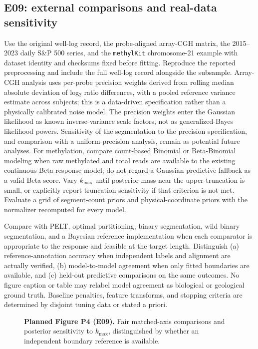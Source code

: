 \subsection{E09: external comparisons and real-data sensitivity}
Use the original well-log record, the probe-aligned array-CGH matrix, the
2015--2023 daily S\&P 500 series, and the \texttt{methylKit} chromosome-21
example with dataset identity and checksums fixed before fitting. Reproduce
the reported preprocessing and include the full well-log record alongside the
subsample. Array-CGH analysis uses per-probe precision weights derived from rolling median absolute deviation of log$_2$ ratio differences, with a pooled reference variance estimate across subjects; this is a data-driven specification rather than a physically calibrated noise model. The precision weights enter the Gaussian likelihood as known inverse-variance scale factors, not as generalized-Bayes likelihood powers. Sensitivity of the segmentation to the precision specification, and comparison with a uniform-precision analysis, remain as potential future analyses.
For methylation, compare count-based Binomial or Beta-Binomial modeling when
raw methylated and total reads are available to the existing continuous-Beta
response model; do not regard a Gaussian predictive fallback as a valid Beta
score. Vary $k_{\max}$ until posterior mass near the upper truncation is
small, or explicitly report truncation sensitivity if that criterion is not
met. Evaluate a grid of segment-count priors and physical-coordinate priors
with the normalizer recomputed for every model.

Compare with PELT, optimal partitioning, binary segmentation, wild binary
segmentation, and a Bayesian reference implementation when each comparator is
appropriate to the response and feasible at the target length. Distinguish
(a) reference-annotation accuracy when independent labels and alignment are
actually verified, (b) model-to-model agreement when only fitted boundaries
are available, and (c) held-out predictive comparisons on the same outcomes.
No figure caption or table may relabel model agreement as biological or
geological ground truth. Baseline penalties, feature transforms, and stopping
criteria are determined by disjoint tuning data or stated a priori.

\begin{figure}[!htbp]
\centering
{}
\hfill
{}
\caption{\textbf{Planned Figure P4 (E09).} Fair matched-axis comparisons and
posterior sensitivity to $k_{\max}$, distinguished by whether an independent
boundary reference is available.}
\label{fig:planned-external-paper}
\end{figure}

